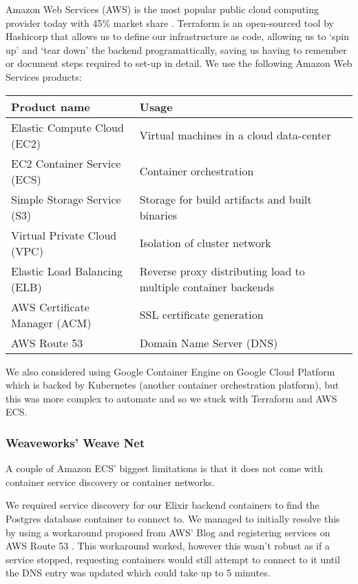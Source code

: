 \documentclass[11pt,a4paper]{report}
\begin{document}
Amazon Web Services (AWS) is the most popular public cloud computing provider today with 45\% market share \cite{website:geekwire_cloud_share}. Terraform is an open-sourced tool by Hashicorp that allows us to define our infrastructure as code, allowing us to `spin up' and `tear down' the backend programattically, saving us having to remember or document steps required to set-up in detail. We use the following Amazon Web Services products:

\begin{tabular}{| l | p{6cm} |}
  \hline
  Product name & Usage \\
  \hline
  Elastic Compute Cloud (EC2) & Virtual machines in a cloud data-center\\
  EC2 Container Service (ECS) & Container orchestration \\
  Simple Storage Service (S3) & Storage for build artifacts and built binaries \\
  Virtual Private Cloud (VPC) & Isolation of cluster network\\
  Elastic Load Balancing (ELB) & Reverse proxy distributing load to multiple container backends\\
  AWS Certificate Manager (ACM) & SSL certificate generation\\
  AWS Route 53 & Domain Name Server (DNS)\\
  \hline
\end{tabular}

We also considered using Google Container Engine on Google Cloud Platform which is backed by Kubernetes (another container orchestration platform), but this was more complex to automate and so we stuck with Terraform and AWS ECS.

\subsubsection{Weaveworks' Weave Net}

A couple of Amazon ECS' biggest limitations is that it does not come with container service discovery or container networks.

We required service discovery for our Elixir backend containers to find the Postgres database container to connect to. We managed to initially resolve this by using a workaround proposed from AWS' Blog and registering services on AWS Route 53 \cite{website:aws_ecs_dns}. This workaround worked, however this wasn't robust as if a service stopped, requesting containers would still attempt to connect to it until the DNS entry was updated which could take up to 5 minutes.
\end{document}

